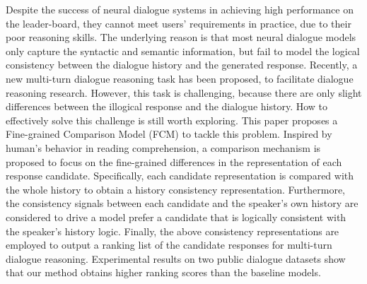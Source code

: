 Despite the success of neural dialogue systems in achieving high performance on the leader-board, they cannot meet users' requirements in practice, due to their poor reasoning skills. The underlying reason is that most neural dialogue models only capture the syntactic and semantic information, but fail to model the logical consistency between the dialogue history and the generated response. Recently, a new multi-turn dialogue reasoning task has been proposed, to facilitate dialogue reasoning research. However, this task is challenging, because there are only slight differences between the illogical response and the dialogue history. How to effectively solve this challenge is still worth exploring. This paper proposes a Fine-grained Comparison Model (FCM) to tackle this problem. Inspired by human's behavior in reading comprehension, a comparison mechanism is proposed to focus on the fine-grained differences in the representation of each response candidate. Specifically, each candidate representation is compared with the whole history to obtain a history consistency representation. Furthermore, the consistency signals between each candidate and the speaker's own history are considered to drive a model prefer a candidate that is logically consistent with the speaker's history logic. Finally, the above consistency representations are employed to output a ranking list of the candidate responses for multi-turn dialogue reasoning. Experimental results on two public dialogue datasets show that our method obtains higher ranking scores than the baseline models.
